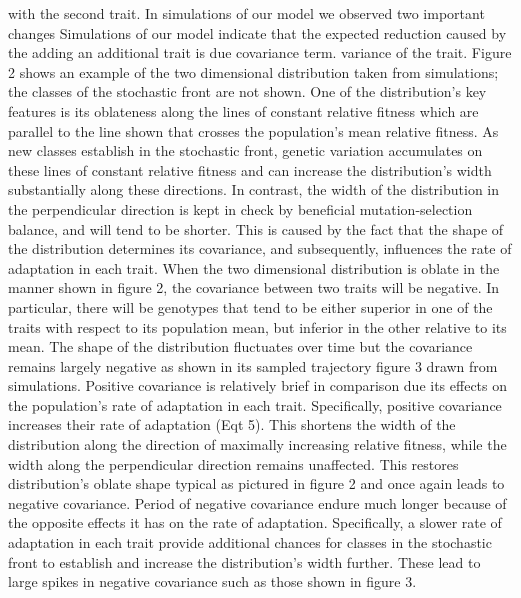 \documentclass[11pt,twocolumn]{article}
\begin{document}
 with the second trait. In simulations of our model we observed two important changes Simulations of our model indicate that the expected reduction caused by the adding an additional trait is due  covariance term. variance of the trait. Figure 2 shows an example of the two dimensional distribution taken from simulations; the classes of the stochastic front are not shown. One of the distribution's key features is its oblateness along the lines of constant relative fitness which are parallel to the line shown that crosses the population's mean relative fitness.  As new classes establish in the stochastic front, genetic variation accumulates on these lines of constant relative fitness and can increase the distribution's width substantially along these directions. In contrast, the width of the distribution in the perpendicular direction is kept in check by beneficial mutation-selection balance, and will tend to be shorter. This is caused by the fact that the shape of the distribution determines its covariance, and subsequently, influences the rate of adaptation in each trait. When the two dimensional distribution is oblate in the manner shown in figure 2, the covariance between two traits will be negative. In particular, there will be genotypes that tend to be either superior in one of the traits with respect to its population mean, but inferior in the other relative to its mean. The shape of the distribution fluctuates over time but the covariance remains largely negative as shown in its sampled trajectory figure 3 drawn from simulations. Positive covariance is relatively brief in comparison due its effects on the population's rate of adaptation in each trait. Specifically, positive covariance increases their rate of adaptation (Eqt 5). This shortens the width of the distribution along the direction of maximally increasing relative fitness, while the width along the perpendicular direction remains unaffected.  This restores distribution's oblate shape typical as pictured in figure 2 and once again leads to negative covariance.  Period of negative covariance endure much longer because of the opposite effects it has on the rate of adaptation. Specifically, a slower rate of adaptation in each trait provide additional chances for classes in the stochastic front to establish and increase the distribution's width further.  These lead to large spikes in negative covariance such as those shown in figure 3. 
% 
% 
% 
% 
\end{document}
